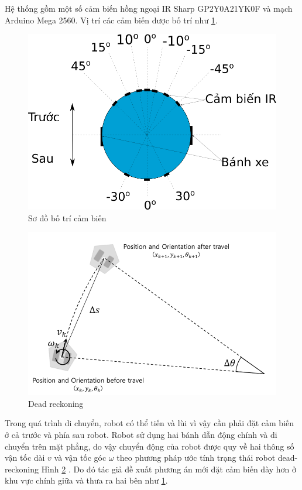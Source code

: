 Hệ thống gồm một số cảm biến hồng ngoại IR Sharp GP2Y0A21YK0F và mạch Arduino Mega 2560. Vị trí các cảm biến được bố trí như \figurename{ \ref{fig:IR_layout}}.

\begin{figure}[htbp]
	\centering
	\includegraphics[width=0.7\linewidth]{figures/IR_layout.png}
	\caption{Sơ đồ bố trí cảm biến}
	\label{fig:IR_layout}
\end{figure}

\begin{figure}[htbp]
    \centering
    \includegraphics[width=0.7\linewidth]{figures/dead-reckoning.png}
    \caption{Dead reckoning \cite{pyo2017ros}}
    \label{fig:dead-reckoning}
\end{figure}

Trong quá trình di chuyển, robot có thể tiến và lùi vì vậy cần phải đặt cảm biến ở cả trước và phía sau robot.
Robot sử dụng hai bánh dẫn động chính và di chuyển trên mặt phẳng, do vậy chuyển động của robot được quy về hai thông số vận tốc dài $v$ và vận tốc góc $\omega$ theo phương pháp ước tính trạng thái robot dead-reckoning Hình \ref{fig:dead-reckoning} \cite{pyo2017ros}.
Do đó tác giả đề xuất phương án mới đặt cảm biến dày hơn ở khu vực chính giữa và thưa ra hai bên như \figurename{ \ref{fig:IR_layout}}.

